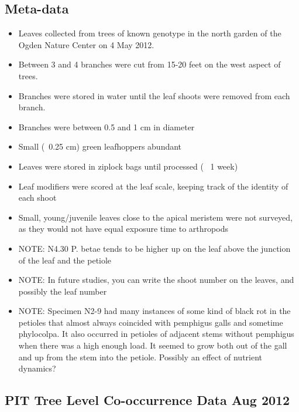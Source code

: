\documentclass[12pt]{article}
\begin{document}
\subsection{Meta-data}
\begin{itemize}
\item Leaves collected from trees of known genotype in the north
  garden of the Ogden Nature Center on 4 May 2012.
\item Between 3 and 4 branches were cut from 15-20 feet on the west
  aspect of trees.
\item Branches were stored in water until the leaf shoots were removed
  from each branch.
\item Branches were between 0.5 and 1 cm in diameter
\item Small (~0.25 cm) green leafhoppers abundant
\item Leaves were stored in ziplock bags until processed (~ 1 week)
\item Leaf modifiers were scored at the leaf scale, keeping track of the
  identity of each shoot
\item Small, young/juvenile leaves close to the apical meristem were
  not surveyed, as they would not have equal exposure time to
  arthropods
\item NOTE: N4.30 P. betae tends to be higher up on the leaf above the
  junction of the leaf and the petiole
\item NOTE: In future studies, you can write the shoot number on the
  leaves, and possibly the leaf number
\item NOTE: Specimen N2-9 had many instances of some kind of black rot
  in the petioles that almost always coincided with pemphigus galls
  and sometime phylocolpa. It also occurred in petioles of adjacent
  stems without pemphigus when there was a high enough load. It seemed
  to grow both out of the gall and up from the stem into the
  petiole. Possibly an effect of nutrient dynamics? 
\end{itemize}


\subsection{PIT Tree Level Co-occurrence Data Aug 2012}
\end{document}

